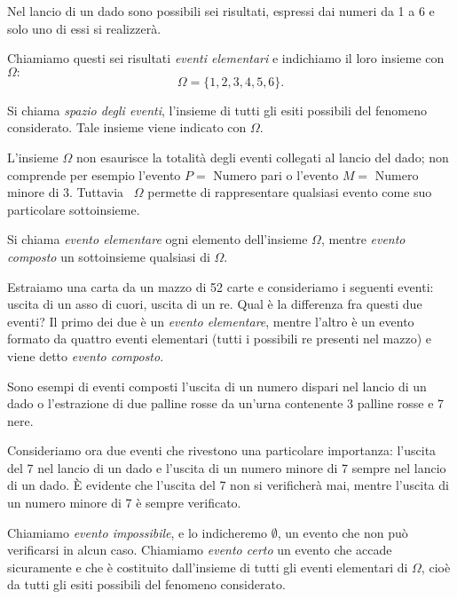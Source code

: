 Nel lancio di un dado sono possibili sei risultati, espressi dai numeri da 1 a 
6 
e solo uno di essi si realizzerà.

Chiamiamo questi sei risultati \emph{eventi elementari} e indichiamo il loro 
insieme con 
$\Omega:$ 
\[\Omega =\{1,2,3,4,5,6\}.\]

\begin{definizione}
Si chiama \emph{spazio degli eventi}, l'insieme di tutti gli esiti possibili 
del 
fenomeno considerato. Tale insieme viene indicato con $\Omega $.
\end{definizione}

L'insieme $\Omega $ non esaurisce la totalità degli eventi collegati al lancio 
del dado; non comprende per esempio l'evento $P=$ Numero pari o l'evento $M=$ 
Numero minore di $3$. Tuttavia~ $\Omega $ permette di rappresentare qualsiasi 
evento come suo particolare sottoinsieme.

\begin{definizione}
Si chiama \emph{evento elementare} ogni elemento dell'insieme $\Omega$, mentre 
\emph{evento composto} un sottoinsieme qualsiasi di $\Omega$.
\end{definizione}

Estraiamo una carta da un mazzo di 52 carte e consideriamo i seguenti eventi: 
uscita di un asso di cuori, uscita di un re. Qual è la differenza fra questi 
due 
eventi? Il primo dei due è un \emph{evento elementare}, mentre l'altro è un 
evento formato da quattro eventi elementari (tutti i possibili re presenti nel 
mazzo) e viene detto \emph{evento composto}.

Sono esempi di eventi composti l'uscita di un numero dispari nel lancio di un 
dado o l'estrazione di due palline rosse da un'urna contenente 3 palline rosse 
e 
7 nere.

Consideriamo ora due eventi che rivestono una particolare importanza: l'uscita 
del 7 nel lancio di un dado e l'uscita di un numero minore di 7 sempre nel 
lancio di un dado. È evidente che l'uscita del 7 non si verificherà mai, mentre 
l'uscita di un numero minore di 7 è sempre verificato.

\begin{definizione}
Chiamiamo \emph{evento impossibile}, e lo indicheremo $\emptyset $, un evento 
che non può verificarsi in alcun caso.
Chiamiamo \emph{evento certo} un evento che accade sicuramente e che è 
costituito dall'insieme di tutti gli eventi elementari di $\Omega $, cioè da 
tutti gli esiti possibili del fenomeno considerato.
\end{definizione}

